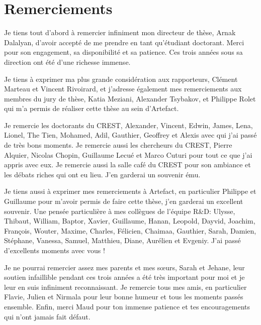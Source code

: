 \chapter*{Remerciements}

Je tiens tout d'abord à remercier infiniment mon directeur de thèse, Arnak Dalalyan, d'avoir accepté de me prendre en tant qu'étudiant doctorant. Merci pour son engagement, sa disponibilité et sa patience. Ces trois années sous sa direction ont été d'une richesse immense.

Je tiens à exprimer ma plus grande considération aux rapporteurs, Clément Marteau et Vincent Rivoirard, et j'adresse également mes remerciements aux membres du jury de thèse, Katia Meziani, Alexander Tsybakov, et Philippe Rolet qui m'a permis de réaliser cette thèse au sein d'Artefact.

Je remercie les doctorants du CREST, Alexander, Vincent, Edwin, James, Lena, Lionel, The Tien, Mohamed, Adil, Gauthier, Geoffrey et Alexis avec qui j'ai passé de très bons moments.
Je remercie aussi les chercheurs du CREST, Pierre Alquier, Nicolas Chopin, Guillaume Lecué et Marco Cuturi pour tout ce que j'ai appris avec eux. Je remercie aussi la salle café du CREST pour son ambiance et les débats riches qui ont eu lieu. J'en garderai un souvenir ému.

Je tiens aussi à exprimer mes remerciements à Artefact, en particulier Philippe et Guillaume pour m'avoir permis de faire cette thèse, j'en garderai un excellent souvenir. Une pensée particulière à mes collègues de l'équipe R\&D: Ulysse, Thibaut, William, Baptor, Xavier, Guillaume, Hanan, Leopold, Dayvid, Joachim, François, Wouter, Maxime, Charles, Félicien, Chaimaa, Gauthier, Sarah, Damien, Stéphane, Vanessa, Samuel, Matthieu, Diane, Aurélien et Evgeniy. J'ai passé d'excellents moments avec vous !

Je ne pourrai remercier assez mes parents et mes sœurs, Sarah et Jehane, leur soutien infaillible pendant ces trois années a été très important pour moi et je leur en suis infiniment reconnaissant.
Je remercie tous mes amis, en particulier Flavie, Julien et Nirmala pour leur bonne humeur et tous les moments passés ensemble.
Enfin, merci Maud pour ton immense patience et tes encouragements qui n'ont jamais fait défaut.
